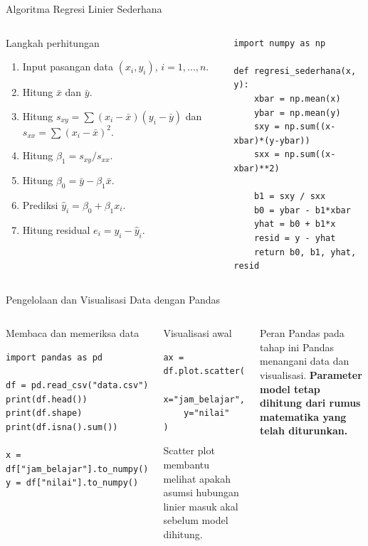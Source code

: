 \documentclass[aspectratio=169,11pt]{beamer}
\begin{document}
\begin{frame}[fragile]{Algoritma Regresi Linier Sederhana}
\begin{columns}[T]
\begin{block}{Langkah perhitungan}
\scriptsize
\begin{enumerate}
  \item Input pasangan data $(x_i,y_i)$, $i=1,\ldots,n$.
  \item Hitung $\bar x$ dan $\bar y$.
  \item Hitung $s_{xy}=\sum(x_i-\bar x)(y_i-\bar y)$ dan $s_{xx}=\sum(x_i-\bar x)^2$.
  \item Hitung $\beta_1=s_{xy}/s_{xx}$.
  \item Hitung $\beta_0=\bar y-\beta_1\bar x$.
  \item Prediksi $\hat y_i=\beta_0+\beta_1x_i$.
  \item Hitung residual $e_i=y_i-\hat y_i$.
\end{enumerate}
\end{block}
\begin{lstlisting}
import numpy as np

def regresi_sederhana(x, y):
    xbar = np.mean(x)
    ybar = np.mean(y)
    sxy = np.sum((x-xbar)*(y-ybar))
    sxx = np.sum((x-xbar)**2)

    b1 = sxy / sxx
    b0 = ybar - b1*xbar
    yhat = b0 + b1*x
    resid = y - yhat
    return b0, b1, yhat, resid
\end{lstlisting}
\end{columns}
\end{frame}

\begin{frame}[fragile]{Pengelolaan dan Visualisasi Data dengan Pandas}
\begin{columns}[T]
\begin{block}{Membaca dan memeriksa data}
\begin{lstlisting}
import pandas as pd

df = pd.read_csv("data.csv")
print(df.head())
print(df.shape)
print(df.isna().sum())

x = df["jam_belajar"].to_numpy()
y = df["nilai"].to_numpy()
\end{lstlisting}
\end{block}
\begin{block}{Visualisasi awal}
\begin{lstlisting}
ax = df.plot.scatter(
    x="jam_belajar",
    y="nilai"
)
\end{lstlisting}
\small
Scatter plot membantu melihat apakah asumsi hubungan linier masuk akal sebelum model dihitung.
\end{block}
\begin{alertblock}{Peran Pandas pada tahap ini}
Pandas menangani data dan visualisasi. \textbf{Parameter model tetap dihitung dari rumus matematika yang telah diturunkan.}
\end{alertblock}
\end{columns}
\end{frame}
\end{document}
